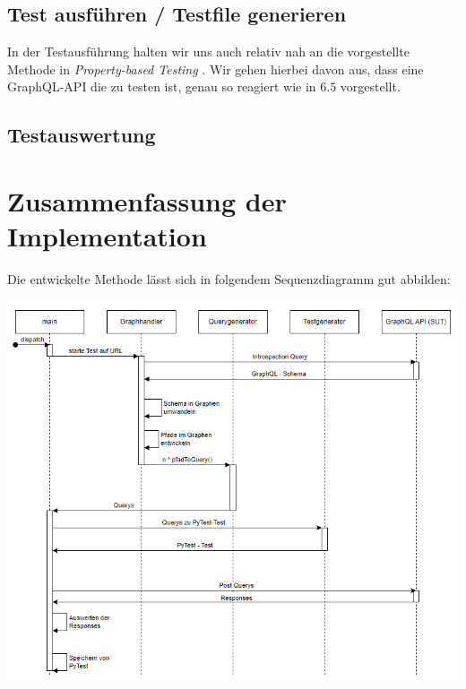 \subsection{Test ausführen / Testfile generieren}

In der Testausführung halten wir uns auch relativ nah an die vorgestellte Methode in \textit{Property-based Testing} \cite{property-based-testing}.
Wir gehen hierbei davon aus, dass eine GraphQL-API die zu testen ist, genau so reagiert wie in $6.5$ vorgestellt.












\subsection{Testauswertung}

\newpage
\section{Zusammenfassung der Implementation}

Die entwickelte Methode lässt sich in folgendem Sequenzdiagramm gut abbilden:

\begin{center}
    \includegraphics[width=\textwidth,height=\textheight,keepaspectratio]{img/sequenz}
\end{center}





